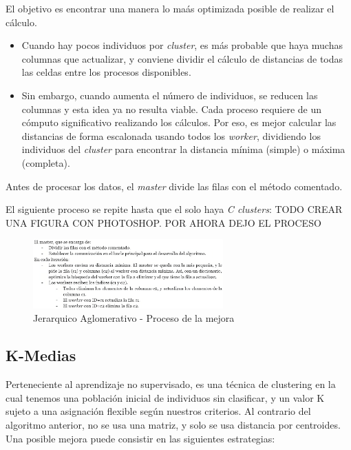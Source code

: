 		El objetivo es encontrar una manera lo maás optimizada posible de realizar el cálculo. 
		\begin{itemize}
			\item Cuando hay pocos individuos por \textit{cluster}, es más probable que haya muchas columnas que actualizar, y conviene dividir el cálculo de distancias de todas las celdas entre los procesos disponibles. 
			\item Sin embargo, cuando aumenta el número de individuos, se reducen las columnas y esta idea ya no resulta viable. Cada proceso requiere de un cómputo significativo realizando los cálculos. Por eso, es mejor calcular las distancias de forma escalonada usando todos los \textit{worker}, dividiendo los individuos del \textit{cluster} para encontrar la distancia mínima (simple) o máxima (completa).
		\end{itemize}
		
		Antes de procesar los datos, el \textit{master} divide las filas con el método comentado. 
		
		El siguiente proceso se repite hasta que el solo haya \textit{C clusters}: \color{blue} TODO CREAR UNA FIGURA CON PHOTOSHOP. POR AHORA DEJO EL PROCESO \color{black}
		
		\begin{figure}[!h]
			\centering
			\includegraphics[width=0.65\textwidth]{images/chapter_3/aglomerativo_sec}
			
			
			\caption{Jerarquico Aglomerativo - Proceso de la mejora}
			\label{fig:JA}
		\end{figure}
		
		
		
		
	\subsection{K-Medias}
		Perteneciente al aprendizaje no supervisado, es una técnica de clustering en la cual tenemos una población inicial de individuos sin clasificar, y un valor K sujeto a una asignación flexible según nuestros criterios. Al contrario del algoritmo anterior, no se usa una matriz, y solo se usa distancia por centroides. Una posible mejora puede consistir en las siguientes estrategias:
		
